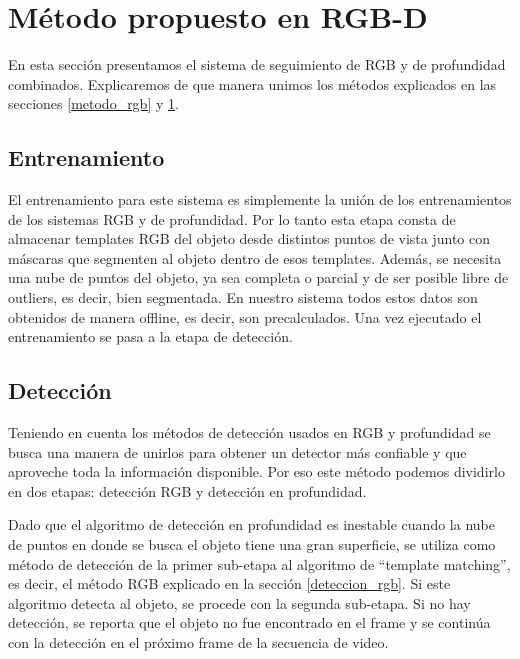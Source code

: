 \section{Método propuesto en RGB-D}\label{metodo_rgbd}
En esta sección presentamos el sistema de seguimiento de RGB y de profundidad combinados. Explicaremos de que manera unimos los métodos explicados en las secciones \ref{metodo_rgb} y \ref{metodo_rgbd}.

\subsection{Entrenamiento}
El entrenamiento para este sistema es simplemente la unión de los entrenamientos de los sistemas RGB y de profundidad. Por lo tanto esta etapa consta de almacenar templates RGB del objeto desde distintos puntos de vista junto con máscaras que segmenten al objeto dentro de esos templates. Además, se necesita una nube de puntos del objeto, ya sea completa o parcial y de ser posible libre de outliers, es decir, bien segmentada. En nuestro sistema todos estos datos son obtenidos de manera offline, es decir, son precalculados. Una vez ejecutado el entrenamiento se pasa a la etapa de detección.

\subsection{Detección}
Teniendo en cuenta los métodos de detección usados en RGB y profundidad se busca una manera de unirlos para obtener un detector más confiable y que aproveche toda la información disponible. Por eso este método podemos dividirlo en dos etapas: detección RGB y detección en profundidad.

Dado que el algoritmo de detección en profundidad es inestable cuando la nube de puntos en donde se busca el objeto tiene una gran superficie, se utiliza como método de detección de la primer sub-etapa al algoritmo de ``template matching'', es decir, el método RGB explicado en la sección \ref{deteccion_rgb}. Si este algoritmo detecta al objeto, se procede con la segunda sub-etapa. Si no hay detección, se reporta que el objeto no fue encontrado en el frame y se continúa con la detección en el próximo frame de la secuencia de video.

